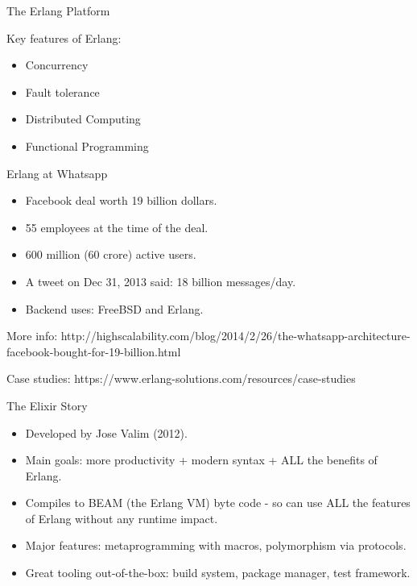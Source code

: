 \documentclass{beamer}
\begin{document}
\begin{frame}{The Erlang Platform}

Key features of Erlang:

\begin{itemize}
  \item Concurrency
  \item Fault tolerance
  \item Distributed Computing
  \item Functional Programming
\end{itemize}

\end{frame}

\begin{frame}{Erlang at Whatsapp}

\begin{itemize}
   \item Facebook deal worth 19 billion dollars.
   \item 55 employees at the time of the deal.
   \item 600 million (60 crore) active users.
   \item A tweet on Dec 31, 2013 said: 18 billion messages/day.
   \item Backend uses: FreeBSD and Erlang.
\end{itemize}
More info: http://highscalability.com/blog/2014/2/26/the-whatsapp-architecture-facebook-bought-for-19-billion.html

Case studies: https://www.erlang-solutions.com/resources/case-studies
\end{frame}

\begin{frame}{The Elixir Story}

\begin{itemize}
  \item Developed by Jose Valim (2012).
  \item Main goals: more productivity + modern syntax + ALL the benefits of Erlang.
  \item Compiles to BEAM (the Erlang VM) byte code - so can use ALL the features of Erlang 
        without any runtime impact.
  \item Major features: metaprogramming with macros, polymorphism via protocols.
  \item Great tooling out-of-the-box: build system, package manager, test framework.
\end{itemize}
\end{frame}
\end{document}
